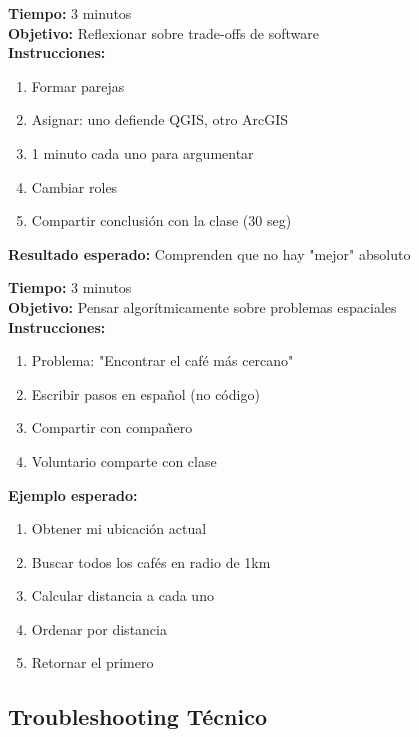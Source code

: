 \documentclass[11pt,a4paper]{article}
\begin{document}
\begin{tcolorbox}[colback=green!5,colframe=green!50!black,title=Actividad 2: Software Speed Dating (Slide 9)]
\textbf{Tiempo:} 3 minutos\\
\textbf{Objetivo:} Reflexionar sobre trade-offs de software\\
\textbf{Instrucciones:}
\begin{enumerate}
    \item Formar parejas
    \item Asignar: uno defiende QGIS, otro ArcGIS
    \item 1 minuto cada uno para argumentar
    \item Cambiar roles
    \item Compartir conclusión con la clase (30 seg)
\end{enumerate}
\textbf{Resultado esperado:} Comprenden que no hay "mejor" absoluto
\end{tcolorbox}

\begin{tcolorbox}[colback=yellow!5,colframe=orange,title=Actividad 3: Pseudo-código Espacial (Slide 21)]
\textbf{Tiempo:} 3 minutos\\
\textbf{Objetivo:} Pensar algorítmicamente sobre problemas espaciales\\
\textbf{Instrucciones:}
\begin{enumerate}
    \item Problema: "Encontrar el café más cercano"
    \item Escribir pasos en español (no código)
    \item Compartir con compañero
    \item Voluntario comparte con clase
\end{enumerate}
\textbf{Ejemplo esperado:}
\begin{enumerate}
    \item Obtener mi ubicación actual
    \item Buscar todos los cafés en radio de 1km
    \item Calcular distancia a cada uno
    \item Ordenar por distancia
    \item Retornar el primero
\end{enumerate}
\end{tcolorbox}

\subsection{Troubleshooting Técnico}
\end{document}
